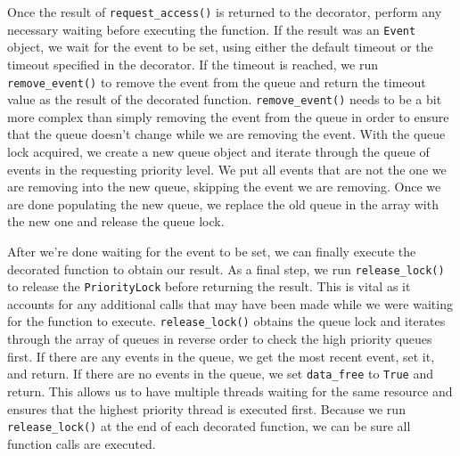 Once the result of \texttt{request\_access()} is returned to the decorator, perform any necessary waiting before executing the function.
If the result was an \texttt{Event} object, we wait for the event to be set, using either the default timeout or the timeout specified in the decorator. 
If the timeout is reached, we run \texttt{remove\_event()} to remove the event from the queue and return the timeout value as the result of the decorated function.
\texttt{remove\_event()} needs to be a bit more complex than simply removing the event from the queue in order to ensure that the queue doesn't change while we are removing the event.
With the queue lock acquired, we create a new queue object and iterate through the queue of events in the requesting priority level.
We put all events that are not the one we are removing into the new queue, skipping the event we are removing. 
Once we are done populating the new queue, we replace the old queue in the array with the new one and release the queue lock.

After we're done waiting for the event to be set, we can finally execute the decorated function to obtain our result.
As a final step, we run \texttt{release\_lock()} to release the \texttt{PriorityLock} before returning the result.
This is vital as it accounts for any additional calls that may have been made while we were waiting for the function to execute.
\texttt{release\_lock()} obtains the queue lock and iterates through the array of queues in reverse order to check the high priority queues first.
If there are any events in the queue, we get the most recent event, set it, and return.
If there are no events in the queue, we set \texttt{data\_free} to \texttt{True} and return.
This allows us to have multiple threads waiting for the same resource and ensures that the highest priority thread is executed first.
Because we run \texttt{release\_lock()} at the end of each decorated function, we can be sure all function calls are executed. 

